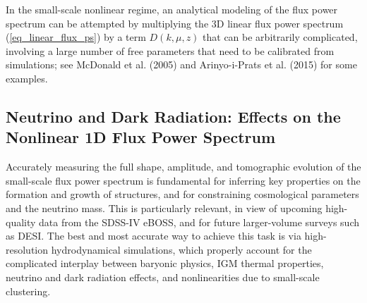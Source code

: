 \documentclass{emulateapj}
\begin{document}
In the small-scale nonlinear regime, an analytical modeling of the flux power spectrum  
can be attempted by multiplying the 3D linear flux power spectrum 
(\ref{eq_linear_flux_ps}) by a term $D(k, \mu, z)$ that can 
be arbitrarily complicated, involving a large number of free parameters that need to be calibrated from simulations; 
see McDonald et al. (2005)
and Arinyo-i-Prats et al. (2015) for some examples. 


\subsection{Neutrino and Dark Radiation: Effects on the Nonlinear 1D Flux Power Spectrum}

Accurately measuring the full shape, amplitude, and tomographic evolution of the small-scale flux power spectrum 
is fundamental for inferring key properties on the formation and growth of structures, and for constraining cosmological parameters and the neutrino mass.
This is particularly relevant, in view of upcoming high-quality data from the SDSS-IV eBOSS, and for future larger-volume surveys such as  DESI.
The best and most accurate way to achieve this task is via high-resolution
hydrodynamical simulations, which properly account for the 
complicated interplay between baryonic physics, IGM thermal properties, 
neutrino and dark radiation effects, and nonlinearities due to small-scale clustering. 

\end{document}

